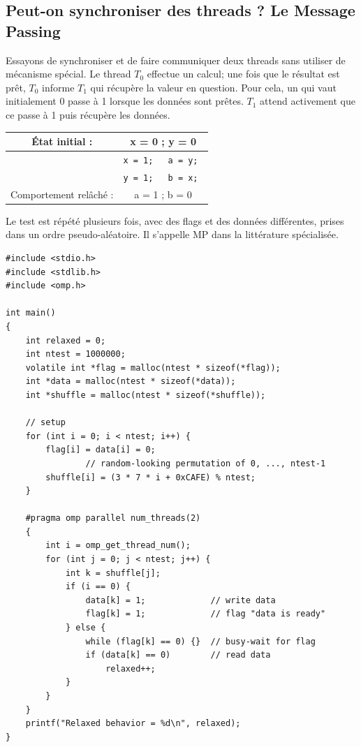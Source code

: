 \subsection{Peut-on synchroniser des threads ? Le \og Message Passing\fg}

Essayons de synchroniser et de faire communiquer deux threads sans utiliser de
mécanisme spécial. Le thread $T_0$ effectue un calcul; une fois que le résultat
est prêt, $T_0$ informe $T_1$ qui récupère la valeur en question. Pour cela, un
 qui vaut initialement 0 passe à 1 lorsque les données sont
prêtes. $T_1$ attend activement que ce  passe à 1 puis récupère
les données.

\begin{center}
\begin{tabular}{|c|p{2cm}||p{2cm}|}
  \hline
  État initial : & \multicolumn{2}{c|}{x = 0 ; y = 0} \\
  \hline
  & \tt x = 1; & \tt a = y; \\
  & \tt y = 1; & \tt b = x; \\
  \hline
  Comportement relâché : & \multicolumn{2}{c|}{a = 1 ; b = 0} \\
  \hline
\end{tabular}
\end{center}

Le test est répété plusieurs fois, avec des flags et des données différentes,
prises dans un ordre pseudo-aléatoire. Il s'appelle MP dans la littérature spécialisée.

\begin{myfilet}
\begin{verbatim}
#include <stdio.h>
#include <stdlib.h>
#include <omp.h>

int main()
{
	int relaxed = 0;
	int ntest = 1000000;
	volatile int *flag = malloc(ntest * sizeof(*flag));
	int *data = malloc(ntest * sizeof(*data));
	int *shuffle = malloc(ntest * sizeof(*shuffle));

	// setup
	for (int i = 0; i < ntest; i++) {
		flag[i] = data[i] = 0;
                // random-looking permutation of 0, ..., ntest-1
		shuffle[i] = (3 * 7 * i + 0xCAFE) % ntest;
	}

	#pragma omp parallel num_threads(2)
	{
		int i = omp_get_thread_num();
		for (int j = 0; j < ntest; j++) {
			int k = shuffle[j];
			if (i == 0) {
				data[k] = 1;             // write data
				flag[k] = 1;             // flag "data is ready"
			} else {
				while (flag[k] == 0) {}  // busy-wait for flag
				if (data[k] == 0)        // read data
					relaxed++;
			}
		}
	}
	printf("Relaxed behavior = %d\n", relaxed);
}
\end{verbatim}
\end{myfilet}

